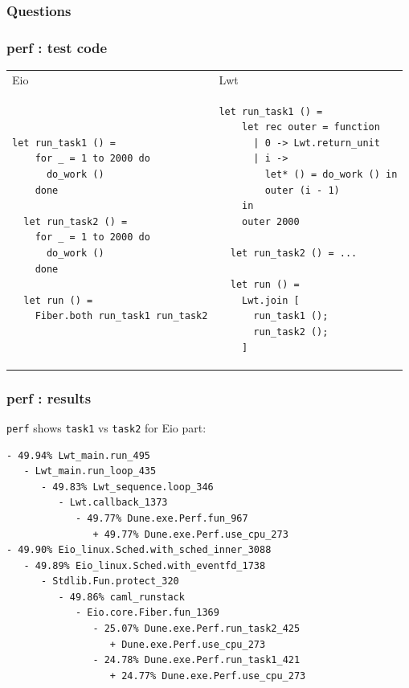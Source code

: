 \documentclass{beamer}
\begin{document}
\begin{frame}
	\frametitle{Questions}
\end{frame}


\begin{frame}[fragile]
	\frametitle{perf : test code}
\begin{tabular}{ll}
        Eio & Lwt \\
\begin{lstlisting}[style=ocaml,boxpos=t]
  let run_task1 () =
    for _ = 1 to 2000 do
      do_work ()
    done

  let run_task2 () =
    for _ = 1 to 2000 do
      do_work ()
    done

  let run () =
    Fiber.both run_task1 run_task2
\end{lstlisting}&
\begin{lstlisting}[style=ocaml,boxpos=t]
  let run_task1 () =
    let rec outer = function
      | 0 -> Lwt.return_unit
      | i ->
        let* () = do_work () in
        outer (i - 1)
    in
    outer 2000

  let run_task2 () = ...

  let run () =
    Lwt.join [
      run_task1 ();
      run_task2 ();
    ]
\end{lstlisting}
\end{tabular}
\end{frame}

\begin{frame}[fragile]
	\frametitle{perf : results}
        \verb|perf| shows \verb|task1| vs \verb|task2| for Eio part:
	\scriptsize
\begin{verbatim}
- 49.94% Lwt_main.run_495
   - Lwt_main.run_loop_435
      - 49.83% Lwt_sequence.loop_346
         - Lwt.callback_1373
            - 49.77% Dune.exe.Perf.fun_967
               + 49.77% Dune.exe.Perf.use_cpu_273
- 49.90% Eio_linux.Sched.with_sched_inner_3088
   - 49.89% Eio_linux.Sched.with_eventfd_1738
      - Stdlib.Fun.protect_320
         - 49.86% caml_runstack
            - Eio.core.Fiber.fun_1369
               - 25.07% Dune.exe.Perf.run_task2_425
                  + Dune.exe.Perf.use_cpu_273
               - 24.78% Dune.exe.Perf.run_task1_421
                  + 24.77% Dune.exe.Perf.use_cpu_273
\end{verbatim}
\end{frame}
\end{document}
